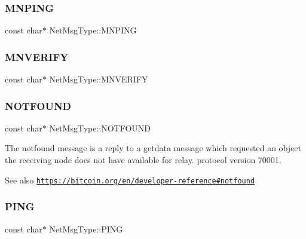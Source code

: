 \subsubsection{\texorpdfstring{M\+N\+P\+I\+NG}{MNPING}}
{\footnotesize\ttfamily const char$\ast$ Net\+Msg\+Type\+::\+M\+N\+P\+I\+NG}

\mbox{\label{namespace_net_msg_type_a11e457f3f6a084d5ec306a57432d4f56}} 
\subsubsection{\texorpdfstring{M\+N\+V\+E\+R\+I\+FY}{MNVERIFY}}
{\footnotesize\ttfamily const char$\ast$ Net\+Msg\+Type\+::\+M\+N\+V\+E\+R\+I\+FY}

\mbox{\label{namespace_net_msg_type_a266e360dbaed7a59bad1dd795b62b6d7}} 
\subsubsection{\texorpdfstring{N\+O\+T\+F\+O\+U\+ND}{NOTFOUND}}
{\footnotesize\ttfamily const char$\ast$ Net\+Msg\+Type\+::\+N\+O\+T\+F\+O\+U\+ND}

The notfound message is a reply to a getdata message which requested an object the receiving node does not have available for relay.  protocol version 70001. \begin{DoxySeeAlso}{See also}
\href{https://bitcoin.org/en/developer-reference#notfound}{\tt https\+://bitcoin.\+org/en/developer-\/reference\#notfound} 
\end{DoxySeeAlso}
\mbox{\label{namespace_net_msg_type_abcbdc691fe213e3b506205238f6e49aa}} 
\subsubsection{\texorpdfstring{P\+I\+NG}{PING}}
{\footnotesize\ttfamily const char$\ast$ Net\+Msg\+Type\+::\+P\+I\+NG}

